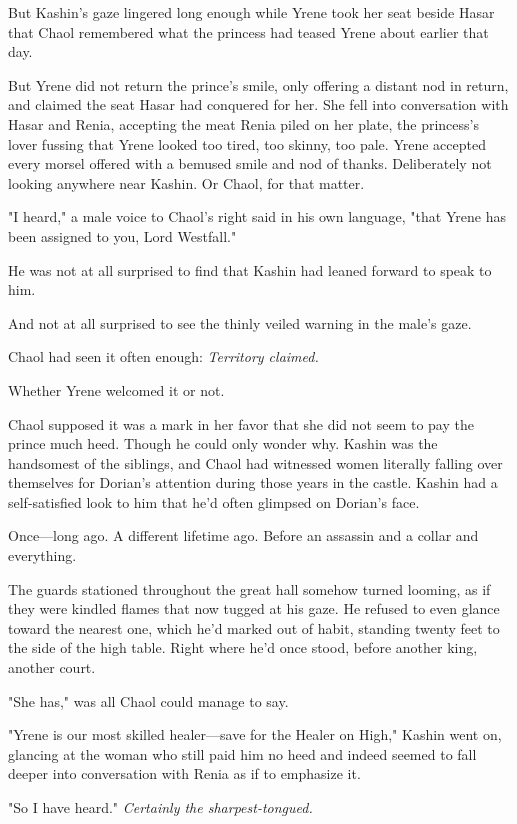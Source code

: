 But Kashin's gaze lingered long enough while Yrene took her seat beside Hasar that Chaol remembered what the princess had teased Yrene about earlier that day.

But Yrene did not return the prince's smile, only offering a distant nod in return, and claimed the seat Hasar had conquered for her.
She fell into conversation with Hasar and Renia, accepting the meat Renia piled on her plate, the princess's lover fussing that Yrene looked too tired, too skinny, too pale.
Yrene accepted every morsel offered with a bemused smile and nod of thanks.
Deliberately not looking anywhere near Kashin.
Or Chaol, for that matter.

"I heard," a male voice to Chaol's right said in his own language, "that Yrene has been assigned to you, Lord Westfall."

He was not at all surprised to find that Kashin had leaned forward to speak to him.

And not at all surprised to see the thinly veiled warning in the male's gaze.

Chaol had seen it often enough: \emph{Territory claimed.}

Whether Yrene welcomed it or not.

Chaol supposed it was a mark in her favor that she did not seem to pay the prince much heed.
Though he could only wonder why.
Kashin was the handsomest of the siblings, and Chaol had witnessed women literally falling over themselves for Dorian's attention during those years in the castle.
Kashin had a self-satisfied look to him that he'd often glimpsed on Dorian's face.

Once---long ago.
A different lifetime ago.
Before an assassin and a collar and everything.

The guards stationed throughout the great hall somehow turned looming, as if they were kindled flames that now tugged at his gaze.
He refused to even glance toward the nearest one, which he'd marked out of habit, standing twenty feet to the side of the high table.
Right where he'd once stood, before another king, another court.

"She has," was all Chaol could manage to say.

"Yrene is our most skilled healer---save for the Healer on High," Kashin went on, glancing at the woman who still paid him no heed and indeed seemed to fall deeper into conversation with Renia as if to emphasize it.

"So I have heard."
\emph{Certainly the sharpest-tongued.}


